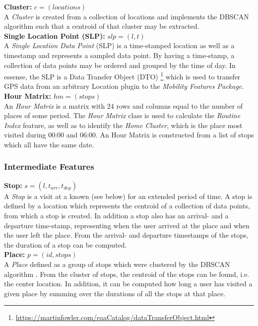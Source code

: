 \textbf{Cluster:} $c = (locations)$\\
A \textit{Cluster} is created from a collection of locations and implements the DBSCAN algorithm \cite{density-based-1996} such that a centroid of that cluster may be extracted.\\

\textbf{Single Location Point (SLP):} $slp = (l, t)$\\
A \textit{Single Location Data Point} (SLP) is a time-stamped location as well as a timestamp and represents a sampled data point. By having a time-stamp, a collection of data points may be ordered and grouped by the time of day. In essense, the SLP is a Data Transfer Object (DTO) \footnote{\url{https://martinfowler.com/eaaCatalog/dataTransferObject.html}} which is used to transfer GPS data from an arbitrary Location plugin to the \textit{Mobility Features Package}.\\

\textbf{Hour Matrix:} $hm = (stops)$\\
An \textit{Hour Matrix} is a matrix with 24 rows and columns equal to the number of places of some period. The \textit{Hour Matrix} class is used to calculate the \textit{Routine Index} feature, as well as to identify the \textit{Home Cluster}, which is the place most visited during 00:00 and 06:00. An Hour Matrix is constructed from a list of stops which all have the same date.\\

\subsubsection*{Intermediate Features}
\textbf{Stop:} $s = (l, t_{arr}, t_{dep})$\\
A \textit{Stop} is a visit at a known  (see below) for an extended period of time. A stop is defined by a location which represents the centroid of a collection of data points, from which a stop is created. In addition a stop also has an arrival- and a departure time-stamp, representing when the user arrived at the place and when the user left the place. From the arrival- and departure timestamps of the stops, the duration of a stop can be computed.\\

\textbf{Place:} $p = (id, stops)$\\
A \textit{Place} defined as a group of stops which were clustered by the DBSCAN algorithm \cite{density-based-1996}. From the cluster of stops, the centroid of the stops can be found, i.e. the center location. In addition, it can be computed how long a user has visited a given place by summing over the durations of all the stops at that place.\\

